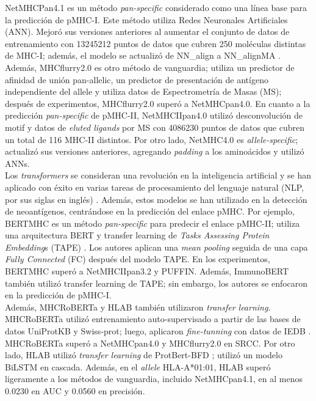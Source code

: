 \documentclass[a4paper]{article}
\begin{document}
	
	

	


		
	
	NetMHCPan4.1 \citep{reynisson2020netmhcpan} es un método 	\textit{pan-specific} considerado como una línea base para la predicción de pMHC-I. Este método utiliza Redes Neuronales Artificiales (ANN). Mejoró sus versiones anteriores al aumentar el conjunto de datos de entrenamiento con 13245212 puntos de datos que cubren 250 moléculas distintas de MHC-I; además, el modelo se actualizó de NN\_align a NN\_alignMA \citep{alvarez2019nnalign_ma}. Además, MHCflurry2.0 \citep{o2020mhcflurry} es otro método de vanguardia; utiliza un predictor de afinidad de unión pan-allelic, un predictor de presentación de antígeno independiente del allele y utiliza datos de Espectrometría de Masas (MS); después de experimentos, MHCflurry2.0 superó a NetMHCpan4.0. En cuanto a la predicción \textit{pan-specific} de pMHC-II, NetMHCIIpan4.0 \citep{reynisson2020netmhcpan} utilizó desconvolución de motif y datos de \textit{eluted ligands} por MS con 4086230 puntos de datos que cubren un total de 116 MHC-II distintos. Por otro lado, NetMHC4.0 \citep{andreatta2016gapped} es \textit{allele-specific}; actualizó sus versiones anteriores, agregando \textit{padding} a los aminoácidos y utilizó ANNs. \\

Los \textit{transformers} se consideran una revolución en la inteligencia artificial y se han aplicado con éxito en varias tareas de procesamiento del lenguaje natural (NLP, por sus siglas en inglés) \citep{patwardhan2023transformers}. Además, estos modelos se han utilizado en la detección de neoantígenos, centrándose en la predicción del enlace pMHC. Por ejemplo, BERTMHC \citep{cheng2021bertmhc} es un método 	\textit{pan-specific} para predecir el enlace pMHC-II; utiliza una arquitectura BERT y transfer learning de \textit{Tasks Assessing Protein Embedding}s (TAPE) \citep{rao2019evaluating}. Los autores aplican una \textit{mean pooling} seguida de una capa \textit{Fully Connected} (FC) después del modelo TAPE. En los experimentos, BERTMHC superó a NetMHCIIpan3.2 y PUFFIN. Además, ImmunoBERT \citep{gasser2021interpreting} también utilizó transfer learning de TAPE; sin embargo, los autores se enfocaron en la predicción de pMHC-I.\\

Además, MHCRoBERTa \citep{wang2022mhcroberta} y HLAB \citep{zhang2022hlab} también utilizaron \textit{transfer learning}. MHCRoBERTa utilizó entrenamiento auto-supervisado a partir de las bases de datos UniProtKB y Swiss-prot; luego, aplicaron \textit{fine-tunning} con datos de IEDB \citep{vita2019immune}. MHCRoBERTa superó a NetMHCpan4.0 y MHCflurry2.0 en SRCC. Por otro lado, HLAB \citep{zhang2022hlab} utilizó \textit{transfer learning} de ProtBert-BFD \citep{elnaggar2021prottrans}; utilizó un modelo BiLSTM en cascada. Además, en el \textit{allele} HLA-A*01:01, HLAB superó ligeramente a los métodos de vanguardia, incluido NetMHCpan4.1, en al menos 0.0230 en AUC y 0.0560 en precisión.\\
\end{document}
